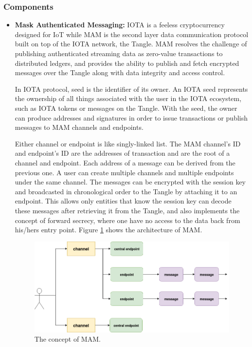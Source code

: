 \documentclass[journal,article,applsci,submit,moreauthors,pdftex]{Definitions/mdpi}
\begin{document}
\subsubsection{Components}
\begin{itemize}[leftmargin=*,labelsep=5.8mm]
\item \textbf{Mask Authenticated Messaging: }
IOTA is a feeless cryptocurrency designed for IoT while MAM is the second layer data communication protocol built on top of the IOTA network, the Tangle. MAM resolves the challenge of publishing authenticated streaming data as zero-value transactions to distributed ledgers, and provides the ability to publish and fetch encrypted messages over the Tangle along with data integrity and access control.

In IOTA protocol, seed is the identifier of its owner. An IOTA seed represents the ownership of all things associated with the user in the IOTA ecosystem, such as IOTA tokens or messages on the Tangle. With the seed, the owner can produce addresses and signatures in order to issue transactions or publish messages to MAM channels and endpoints.

Either channel or endpoint is like singly-linked list. The MAM channel's ID and endpoint's ID are the addresses of transaction and are the root of a channel and endpoint. Each address of a message can be derived from the previous one. A user can create multiple channels and multiple endpoints under the same channel. The messages can be encrypted with the session key and broadcasted in chronological order to the Tangle by attaching it to an endpoint. This allows only entities that know the session key can decode these messages after retrieving it from the Tangle, and also implements the concept of forward secrecy, where one have no access to the data back from his/hers entry point. Figure \ref{fig:mam_struct} shows the architecture of MAM.

\begin{figure}[H]
    \centering
    \includegraphics[width=4.4 in]{mam_struct}
    \caption{The concept of MAM.}
    \label{fig:mam_struct}
\end{figure}


\end{itemize}
\end{document}
